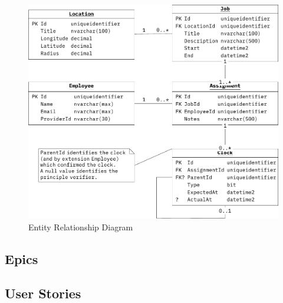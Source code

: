 \begin{figure}[H]
  \centering
  \includegraphics[width=\linewidth]
  {05 design/assets/entity relationship diagram.pdf}
  \caption{Entity Relationship Diagram}
  \label{fig:erd}
\end{figure}

\subsection{Epics} \label{ss:epics}



\subsection{User Stories} \label{ss:stories}

